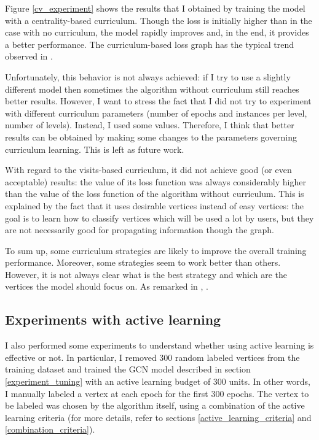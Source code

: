             Figure \ref{cv_experiment} shows the results that I obtained by training the model with a centrality-based curriculum. Though the loss is initially higher than in the case with no curriculum, the model rapidly improves and, in the end, it provides a better performance. The curriculum-based loss graph has the typical trend observed in \cite{Bengio}.
            
            Unfortunately, this behavior is not always achieved: if I try to use a slightly different model then sometimes the algorithm without curriculum still reaches better results. However, I want to stress the fact that I did not try to experiment with different curriculum parameters (number of epochs and instances per level, number of levels). Instead, I used some  values. Therefore, I think that better results can be obtained by making some changes to the parameters governing curriculum learning. This is left as future work.
            
            With regard to the visits-based curriculum, it did not achieve good (or even acceptable) results: the value of its loss function was always considerably higher than the value of the loss function of the algorithm without curriculum. This is explained by the fact that it uses desirable vertices instead of easy vertices: the goal is to learn how to classify vertices which will be used a lot by users, but they are not necessarily good for propagating information though the graph.
            
            To sum up, some curriculum strategies are likely to improve the overall training performance. Moreover, some strategies seem to work better than others. However, it is not always clear what is the best strategy and which are the vertices the model should focus on. As \citeauthor{Bengio} remarked in \cite{Bengio}, .
        \subsection{Experiments with active learning}
            I also performed some experiments to understand whether using active learning is effective or not. In particular, I removed 300 random labeled vertices from the training dataset and trained the GCN model described in section \ref{experiment_tuning} with an active learning budget of 300 units. In other words, I manually labeled a vertex at each epoch for the first 300 epochs. The vertex to be labeled was chosen by the algorithm itself, using a combination of the active learning criteria (for more details, refer to sections \ref{active_learning_criteria} and \ref{combination_criteria}).
            
